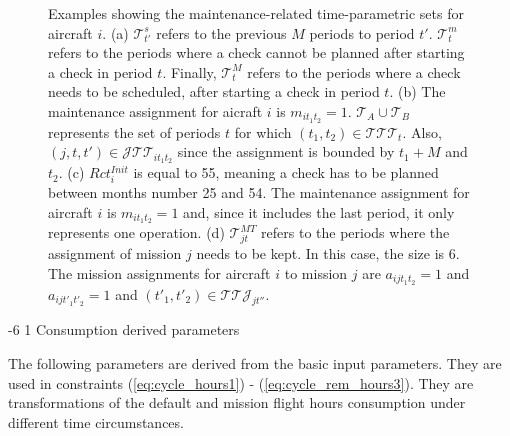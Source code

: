 \documentclass[a4paper,onecolumn,fleqn]{article}
\makeatletter
\renewcommand\subsubsection{\@startsection{subsubsection}{3}{\z@}%
                       {-6\p@ \@plus -0\p@ \@minus -0\p@}%
                       {1\p@ \@plus 0\p@ \@minus 0\p@}%
                       {\normalsize\itshape\bfseries}}
\makeatother
\begin{document}
    \begin{figure}
        \centering
        \begin{tikzpicture}
            
        \end{tikzpicture}
        \begin{tikzpicture}
            
        \end{tikzpicture}
        \begin{tikzpicture}
            
        \end{tikzpicture}
        \begin{tikzpicture}
            
        \end{tikzpicture}
        \caption{Examples showing the maintenance-related time-parametric sets for aircraft $i$. (a) $\mathcal{T}_{t'}^{s}$ refers to the previous $M$ periods to period $t'$. $\mathcal{T}_{t}^{m}$ refers to the periods where a check cannot be planned after starting a check in period $t$. Finally, $\mathcal{T}_{t}^{M}$ refers to the periods where a check needs to be scheduled, after starting a check in period $t$. (b) The maintenance assignment for aicraft $i$ is $m_{it_1t_2}=1$. $\mathcal{T}_A \cup \mathcal{T}_B$ represents the set of periods $t$ for which $(t_1, t_2) \in \mathcal{TTT}_t$. Also, $(j, t, t') \in \mathcal{J}\mathcal{T}\mathcal{T}_{it_1t_2}$ since the assignment is bounded by $t_1 + M$ and $t_2$. (c) $Rct_{i}^{Init}$ is equal to 55, meaning a check has to be planned between months number 25 and 54. The maintenance assignment for aircraft $i$ is $m_{it_1t_2}=1$ and, since it includes the last period, it only represents one operation. (d) $\mathcal{T}_{jt}^{MT}$ refers to the periods where the assignment of mission $j$ needs to be kept. In this case, the size is 6. The mission assignments for aircraft $i$ to mission $j$ are $a_{ijt_1t_2}=1$ and $a_{ijt'_1t'_2}=1$ and $(t'_1, t'_2) \in \mathcal{T}\mathcal{T}\mathcal{J}_{jt''}$.}
        \label{fig:gantt_windows}
    \end{figure}

    \subsubsection{Consumption derived parameters}\label{subsubsec:consumption}

    The following parameters are derived from the basic input parameters. They are used in constraints (\ref{eq:cycle_hours1}) - (\ref{eq:cycle_rem_hours3}). They are transformations of the default and mission flight hours consumption under different time circumstances.
\end{document}
